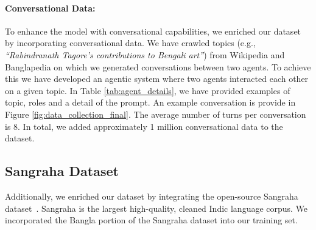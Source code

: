 





\paragraph{Conversational Data:}
To enhance the model with conversational capabilities, we enriched our dataset by incorporating conversational data. We have crawled topics (e.g.,  \textit{``Rabindranath Tagore's contributions
to Bengali art''}) from Wikipedia and Banglapedia on which we generated conversations between two agents. To achieve this we have developed an agentic system where two agents interacted each other on a given topic. In Table \ref{tab:agent_details}, we have provided examples of topic, roles and a detail of the prompt. An example conversation is provide in Figure \ref{fig:data_collection_final}. The average number of turns per conversation is 8. In total, we added approximately 1 million conversational data to the dataset. 


\subsection{Sangraha Dataset}
Additionally, we enriched our dataset by integrating the open-source Sangraha dataset~\cite{khan2024indicllmsuite}. Sangraha is the largest high-quality, cleaned Indic language corpus. We incorporated the Bangla portion of the Sangraha dataset into our training set. 




